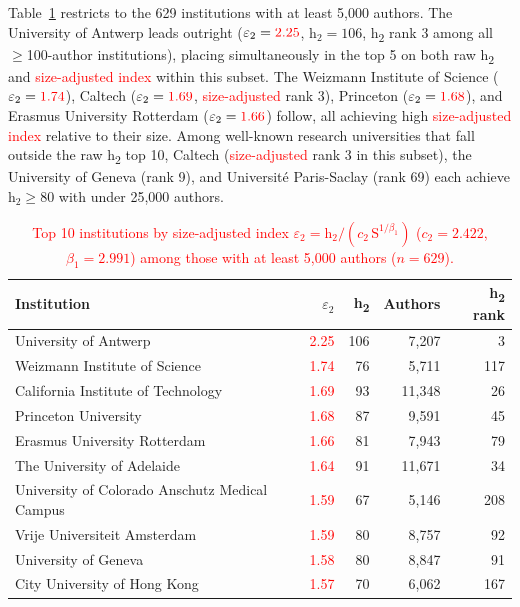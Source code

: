 Table~\ref{tab:h2-efficiency} restricts to the 629 institutions with at least 5,000 authors. The University of Antwerp leads outright ($\varepsilon_2 = \textcolor{red}{2.25}$, $\mathrm{h}_2 = 106$, h\textsubscript{2} rank 3 among all $\geq$100-author institutions), placing simultaneously in the top 5 on both raw h\textsubscript{2} and \textcolor{red}{size-adjusted index} within this subset. The Weizmann Institute of Science ($\varepsilon_2 = \textcolor{red}{1.74}$), Caltech ($\varepsilon_2 = \textcolor{red}{1.69}$, \textcolor{red}{size-adjusted} rank 3), Princeton ($\varepsilon_2 = \textcolor{red}{1.68}$), and Erasmus University Rotterdam ($\varepsilon_2 = \textcolor{red}{1.66}$) follow, all achieving high \textcolor{red}{size-adjusted index} relative to their size. Among well-known research universities that fall outside the raw h\textsubscript{2} top 10, Caltech (\textcolor{red}{size-adjusted} rank 3 in this subset), the University of Geneva (rank 9), and Universit\'{e} Paris-Saclay (rank 69) each achieve $\mathrm{h}_2 \geq 80$ with under 25,000 authors.

\begin{table}[h]
	\centering
	\caption{\textcolor{red}{Top 10 institutions by size-adjusted index $\varepsilon_2 = \mathrm{h}_2 / (c_2\,\mathrm{S}^{1/\beta_1})$ ($c_2 = 2.422$, $\beta_1 = 2.991$) among those with at least 5,000 authors ($n = 629$).}}
	\label{tab:h2-efficiency}
	\begin{tabular}{@{}lrrrr@{}}
	\toprule
	Institution & $\varepsilon_2$ & h\textsubscript{2} & Authors & h\textsubscript{2} rank \\
	\midrule
	University of Antwerp                         & \textcolor{red}{2.25} & 106 & 7,207  & 3   \\
	Weizmann Institute of Science                 & \textcolor{red}{1.74} & 76  & 5,711  & 117 \\
	California Institute of Technology            & \textcolor{red}{1.69} & 93  & 11,348 & 26  \\
	Princeton University                          & \textcolor{red}{1.68} & 87  & 9,591  & 45  \\
	Erasmus University Rotterdam                  & \textcolor{red}{1.66} & 81  & 7,943  & 79  \\
	The University of Adelaide                    & \textcolor{red}{1.64} & 91  & 11,671 & 34  \\
	University of Colorado Anschutz Medical Campus & \textcolor{red}{1.59} & 67  & 5,146  & 208 \\
	Vrije Universiteit Amsterdam                  & \textcolor{red}{1.59} & 80  & 8,757  & 92  \\
	University of Geneva                          & \textcolor{red}{1.58} & 80  & 8,847  & 91  \\
	City University of Hong Kong                  & \textcolor{red}{1.57} & 70  & 6,062  & 167 \\
	\bottomrule
	\end{tabular}
\end{table}

